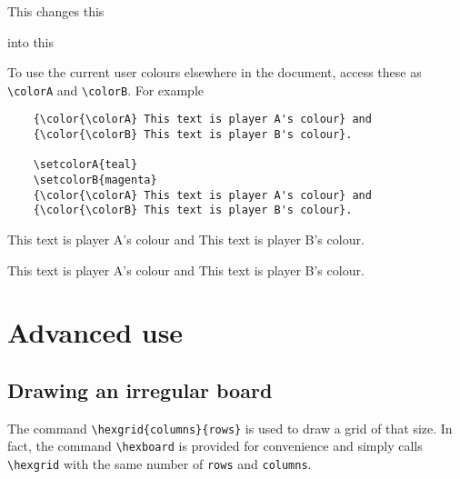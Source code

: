 \documentclass[a4paper,12pt]{article}
\begin{document}
    This changes this\\
    
    \begin{hexpicture}
    \end{hexpicture}

    into this\\
    
    \begin{hexpicture}
    \end{hexpicture}
    
    To use the current user colours elsewhere in the document, access these as \verb|\colorA| and \verb|\colorB|. For example
    
    \begin{verbatim}
    {\color{\colorA} This text is player A's colour} and 
    {\color{\colorB} This text is player B's colour}.
    
    \setcolorA{teal}
    \setcolorB{magenta}
    {\color{\colorA} This text is player A's colour} and 
    {\color{\colorB} This text is player B's colour}.
    \end{verbatim}
    
    {\color{\colorA} This text is player A's colour} and 
    {\color{\colorB} This text is player B's colour}.
    
    {\color{\colorA} This text is player A's colour} and 
    {\color{\colorB} This text is player B's colour}.
    
    
    \section{Advanced use}
    
    \subsection{Drawing an irregular board}
    
    The command \verb|\hexgrid{columns}{rows}| is used to draw a grid of that size. In fact, the command \verb|\hexboard| is provided for convenience and simply calls \verb|\hexgrid| with the same number of \verb|rows| and \verb|columns|.
    
\end{document}
